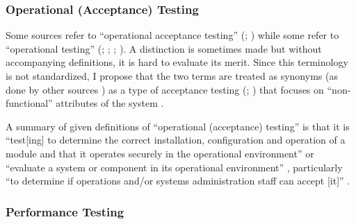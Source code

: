 \subsubsection{Operational (Acceptance) Testing}
Some sources refer to ``operational acceptance testing'' (\citealp[p.~22]{IEEE2022};
) while some refer to ``operational testing''
(\citealp[p.~6-9,~in the context of software engineering operations]{SWEBOK2024};
\citealp{ISO_IEC2018}; \citealp[p.~303]{IEEE2017};
\citealp[pp.~4-6,~4-9]{SWEBOK2014}). A distinction is sometimes made
\citep[p.~30]{Firesmith2015} but without accompanying definitions, it is hard
to evaluate its merit. Since this terminology is not standardized, I
propose that the two terms are treated as synonyms (as done by other sources
\citep{LambdaTest2024, BocchinoAndHamilton1996}) as a type of
acceptance testing (\citealp[p.~22]{IEEE2022}; ) that focuses on
``non-functional'' attributes of the system \citep{LambdaTest2024}
.

A summary of given definitions of ``operational (acceptance) testing'' is that
it is ``test[ing] to determine the correct
installation, configuration and operation of a module and that it operates
securely in the operational environment'' \citep{ISO_IEC2018} or ``evaluate a
system or component in its operational environment'' \citep[p.~303]{IEEE2017},
particularly ``to determine if operations and/or systems administration staff
can accept [it]'' .

\subsubsection{Performance Testing}
\label{perf-test-ambiguity}

